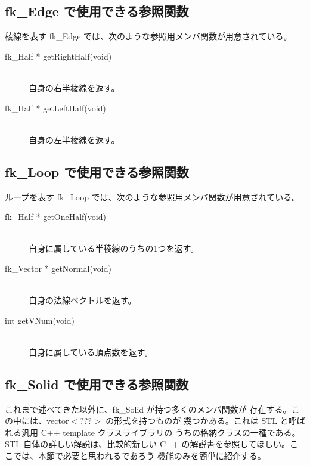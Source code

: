 \subsection{fk\_Edge で使用できる参照関数}
稜線を表す fk\_Edge では、次のような参照用メンバ関数が用意されている。
\begin{description}
 \item[\hspace*{0.6cm}fk\_Half * getRightHalf(void)] ~ \\
	自身の右半稜線を返す。
 \item[\hspace*{0.6cm}fk\_Half * getLeftHalf(void)] ~ \\
	自身の左半稜線を返す。
\end{description}

\subsection{fk\_Loop で使用できる参照関数}
ループを表す fk\_Loop では、次のような参照用メンバ関数が用意されている。
\begin{description}
 \item[\hspace*{0.6cm}fk\_Half * getOneHalf(void)] ~ \\
	自身に属している半稜線のうちの1つを返す。
 \item[\hspace*{0.6cm}fk\_Vector * getNormal(void)] ~ \\
	自身の法線ベクトルを返す。
 \item[\hspace*{0.6cm}int getVNum(void)] ~ \\
	自身に属している頂点数を返す。
\end{description}

\subsection{fk\_Solid で使用できる参照関数}
これまで述べてきた以外に、fk\_Solid が持つ多くのメンバ関数が
存在する。この中には、vector\(<\)???\(>\) の形式を持つものが
幾つかある。これは STL と呼ばれる汎用 C++ template クラスライブラリの
うちの格納クラスの一種である。STL 自体の詳しい解説は、比較的新しい
C++ の解説書を参照してほしい。ここでは、本節で必要と思われるであろう
機能のみを簡単に紹介する。

